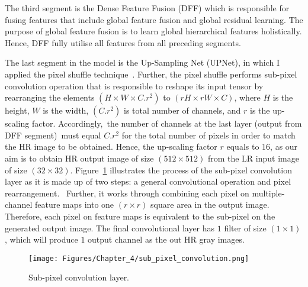 The third segment is the Dense Feature Fusion (DFF) which is responsible for fusing features that include global feature fusion and global residual learning.
The purpose of global feature fusion is to learn global hierarchical features holistically.
Hence, DFF fully utilise all features from all preceding segments.

The last segment in the model is the Up-Sampling Net (UPNet), in which I applied the pixel shuffle technique~\cite{Shi2016}.
Further, the pixel shuffle performs sub-pixel convolution operation that is responsible to reshape its input tensor by rearranging the elements \((H\times W\times C.r^2)\) to \((rH\times rW\times C)\), where \(H\) is the height, \(W\) is the width, \((C.r^2)\) is total number of channels, and \(r\) is the up-scaling factor.
Accordingly, the number of channels at the last layer (output from DFF segment) must equal \(C.r^2\) for the total number of pixels in order to match the HR image to be obtained.
Hence, the up-scaling factor \(r\) equals to \(16\), as our aim is to obtain HR output image of size \((512\times 512)\) from the LR input image of size \((32\times 32)\).
Figure~\ref{fig:sub_pixel_layer} illustrates the process of the sub-pixel convolution layer as it is made up of two steps: a general convolutional operation and pixel rearrangement. 
Further, it works through combining each pixel on multiple-channel feature maps into one \((r\times r)\) square area in the output image. 
Therefore, each pixel on feature maps is equivalent to the sub-pixel on the generated output image.
The final convolutional layer has \(1\) filter of size \((1\times 1)\), which will produce \(1\) output channel as the out HR gray images. 
\begin{figure} [h!]
	\begin{center}
		\texttt{[image: Figures/Chapter\_4/sub\_pixel\_convolution.png]}
	\end{center}
	\caption{Sub-pixel convolution layer.} 
	\label{fig:sub_pixel_layer}
\end{figure}
\newpage